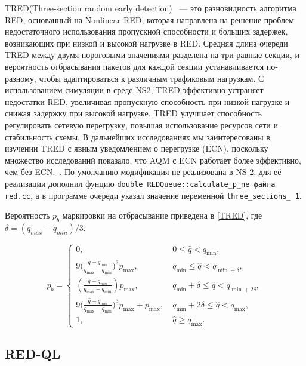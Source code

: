 TRED(Three-section random early detection) ~--- это разновидность алгоритма RED, основанный на Nonlinear RED, которая направлена на решение проблем недостаточного использования пропускной способности и больших задержек, возникающих при низкой и высокой нагрузке в RED. 
Средняя длина очереди TRED между двумя пороговыми значениями разделена на три равные секции, и вероятность отбрасывания пакетов для каждой секции устанавливается по-разному, чтобы адаптироваться к различным трафиковым нагрузкам. С использованием симуляции в среде NS2, TRED эффективно устраняет недостатки RED, увеличивая пропускную способность при низкой нагрузке и снижая задержку при высокой нагрузке. TRED улучшает способность регулировать сетевую перегрузку, повышая использование ресурсов сети и стабильность схемы. В дальнейших исследованиях мы заинтересованы в изучении TRED с явным уведомлением о перегрузке (ECN), поскольку множество исследований показало, что AQM с ECN работает более эффективно, чем без ECN.~\cite{TRED}. По умолчанию модификация не реализована в NS-2, для её реализации дополнил фунцию \verb|double REDQueue::calculate_p_ne файла red.cc|, а в программе очереди указал значение переменной \verb|three_sections_ 1|. 

Вероятность $p_{b}$ маркировки на отбрасывание приведена в \eqref{TRED}, где $ \delta = (q_{max} - q_{min})/3 $.

\begin{equation}
\label{TRED}
p_{b} = \begin{cases}
        0, &  \ 0 \leqslant \hat{q} < q_{\min},
        \\
        9({\frac{\hat{q} - q_{\min}}{q_{\max} - q_{\min}})^3} {p_{\max}}, & \ q_{\min} \leqslant  \hat{q} < q_{\min + \delta},
        \\
        (\frac{\hat{q} - q_{\min}}{q_{\max} - q_{\min}}) {p_{\max}}, & \ q_{\min} + \delta \leqslant \hat{q} < q_{\min + 2\delta},
        \\
        9({\frac{\hat{q} - q_{\min}}{q_{\max} - q_{\min}})^3} {p_{\max}} + {p_{\max}}, & \ q_{\min} +2\delta \leqslant  \hat{q} < q_{\max},
        \\
        1, &  \ \hat{q} \geqslant q_{\max}.
\end{cases}
\end{equation} 


\subsection{RED-QL}

